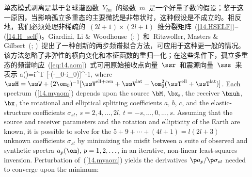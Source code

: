单态模式剥离是基于复球谐函数~$Y_{lm}$~的级数~$m$~是一个好量子数的假设；鉴于这一原因，当影响孤立多重态的主要微扰是非带状时，这种假设是不成立的。相反地，我们必须处理非稀疏的~$(2l+1)\times(2l+1)$~维分裂矩阵~(\ref{14.HSELF})--(\ref{14.H_self})。Giardini, Li \& Woodhouse~(\citeyear{giardini&al87};
\citeyear{giardini&al88})~和~Ritzwoller, Masters \& Gilbert~(\citeyear{ritzwoller&al86};
\citeyear{ritzwoller&al88})~提出了一种创新的两步频谱拟合方法，可应用于这种更一般的情况。该方法忽略了非弹性的横向变化和本征函数的重归一化；在这些条件下，孤立多重态的频谱响应~(\ref{eq:14.aom})~式可用原始接收点向量~$\ssr$~和震源向量~$\sss$~来表示
\eq \label{14.myaom}
a(\omega)=\half i\hspace{0.1 mm}\ssr^{\rm T}
[\ssH-(\omega-\omega_0-i\gamma_0)\ssI]^{-1}\sss,
\en
\iffalse
where $\ssH=\ssW+(2\om_0)^{-1}[\ssV^{\rm ell+cen}+
\ssV^{\rm lat}-\om_0^2(\ssT^{\rm ell}+\ssT^{\rm lat})]$.
Each spectrum~(\ref{14.myaom}) depends upon the 
source $\bM$, $\bx_{\rm s}$, the receiver $\bnuh$,
$\bx$, the rotational and elliptical splitting
coefficients $a$, $b$, $c$, and the elastic-structure
coefficients $\sigma_{st}$, $s=2,4,\ldots,2l$,
$t=-s,\ldots,0,\ldots,s$.  Assuming that the source and
receiver parameters and the rotation and ellipticity
of the Earth are known, it is possible to solve for
the $5+9+\cdots +(4l+1)=l(2l+3)$ unknown coefficients $\sigma_{st}$
by minimizing the misfit between a suite of observed and
synthetic spectra $a_p(\om),\,p=1,2,\ldots$, in an iterative, non-linear
least-squares inversion.  Perturbation of~(\ref{14.myaom})
yields the derivatives $\p a_p/\p\sigma_{st}$ needed
to converge upon the minimum:

